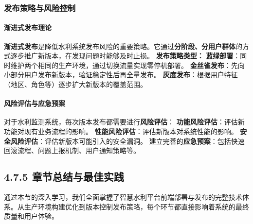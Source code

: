 \subsubsection{发布策略与风险控制}\label{ux53d1ux5e03ux7b56ux7565ux4e0eux98ceux9669ux63a7ux5236}
\paragraph{渐进式发布理论}\label{ux6e10ux8fdbux5f0fux53d1ux5e03ux7406ux8bba}
\textbf{渐进式发布}是降低水利系统发布风险的重要策略。它通过\textbf{分阶段、分用户群体}的方式逐步推广新版本，在发现问题时能够及时止损。 \textbf{发布策略类型：}
\textbf{蓝绿部署}：同时维护两个相同的生产环境，通过切换流量实现零停机部署。 \textbf{金丝雀发布}：先向小部分用户发布新版本，验证稳定性后再全量发布。
\textbf{灰度发布}：根据用户特征（地区、角色等）逐步扩大新版本的覆盖范围。
\paragraph{风险评估与应急预案}\label{ux98ceux9669ux8bc4ux4f30ux4e0eux5e94ux6025ux9884ux6848} 对于水利监测系统，每次版本发布都需要进行\textbf{风险评估}：
\textbf{功能风险评估}：评估新功能对现有业务流程的影响。 \textbf{性能风险评估}：评估新版本对系统性能的影响。 \textbf{安全风险评估}：评估新版本可能引入的安全漏洞。
建立完善的\textbf{应急预案}：包括快速回滚流程、问题上报机制、用户通知策略等。 \subsection{4.7.5
章节总结与最佳实践}\label{ux7ae0ux8282ux603bux7ed3ux4e0eux6700ux4f73ux5b9eux8df5}
通过本节的深入学习，我们全面掌握了智慧水利平台前端部署与发布的完整技术体系。从生产环境构建优化到版本控制发布策略，每个环节都直接影响着系统的最终质量和用户体验。
